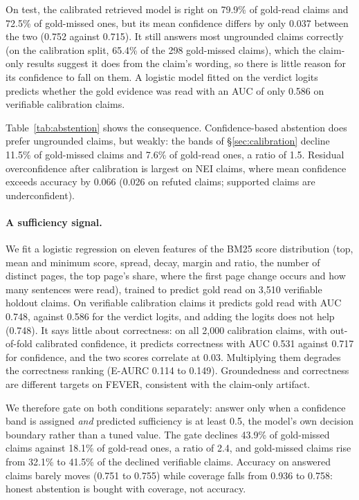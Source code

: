 \documentclass[11pt]{article}
\begin{document}
On test, the calibrated retrieved model is right on 79.9\% of gold-read claims and 72.5\% of gold-missed
ones, but its mean confidence differs by only 0.037 between the two (0.752 against 0.715). It still answers
most ungrounded claims correctly (on the calibration split, 65.4\% of the 298 gold-missed claims), which
the claim-only results suggest it does from the claim's wording, so there is little reason for its
confidence to fall on them. A logistic model fitted on the verdict logits predicts whether the gold
evidence was read with an AUC of only 0.586 on verifiable calibration claims.

Table~\ref{tab:abstention} shows the consequence. Confidence-based abstention does prefer ungrounded claims,
but weakly: the bands of \S\ref{sec:calibration} decline 11.5\% of gold-missed claims and 7.6\% of gold-read
ones, a ratio of 1.5. Residual overconfidence after calibration is largest on NEI claims, where mean
confidence exceeds accuracy by 0.066 (0.026 on refuted claims; supported claims are underconfident).

\paragraph{A sufficiency signal.} We fit a logistic regression on eleven features of the BM25 score
distribution (top, mean and minimum score, spread, decay, margin and ratio, the number of distinct pages,
the top page's share, where the first page change occurs and how many sentences were read), trained to
predict gold read on 3,510 verifiable holdout claims. On verifiable calibration claims it predicts gold
read with AUC 0.748, against 0.586 for the verdict logits, and adding the logits does not help (0.748).
It says little about correctness: on all 2,000 calibration claims, with out-of-fold calibrated confidence,
it predicts correctness with AUC 0.531 against 0.717 for confidence, and the two scores correlate at 0.03.
Multiplying them degrades the correctness ranking (E-AURC 0.114 to 0.149). Groundedness and correctness
are different targets on FEVER, consistent with the claim-only artifact.

We therefore gate on both conditions separately: answer only when a confidence band is assigned
\emph{and} predicted sufficiency is at least 0.5, the model's own decision boundary rather than a tuned
value. The gate declines 43.9\% of gold-missed claims against 18.1\% of gold-read ones, a ratio of 2.4,
and gold-missed claims rise from 32.1\% to 41.5\% of the declined verifiable claims. Accuracy on answered
claims barely moves (0.751 to 0.755) while coverage falls from 0.936 to 0.758: honest abstention is bought
with coverage, not accuracy.
\end{document}
